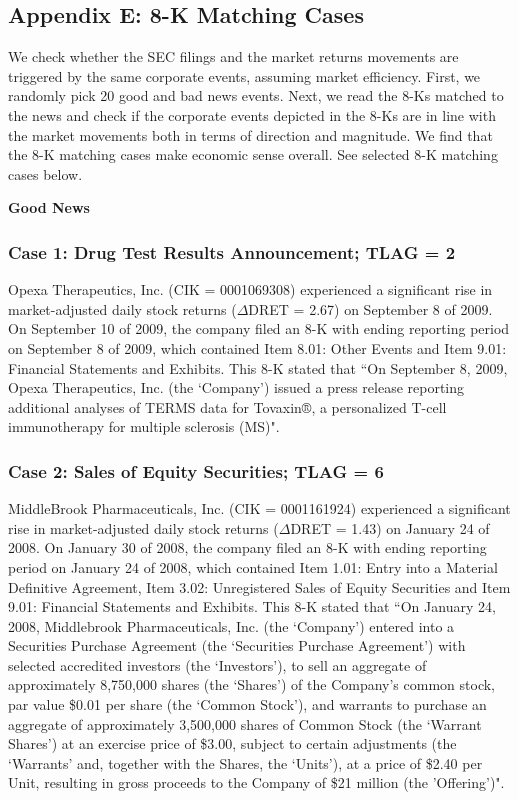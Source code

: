 \newpage
\begin{small}
\subsection*{Appendix E: 8-K Matching Cases}
We check whether the SEC filings and the market returns movements are triggered by the same corporate events, assuming market efficiency. First, we randomly pick 20 good and bad news events. Next, we read the 8-Ks matched to the news and check if the corporate events depicted in the 8-Ks are in line with the market movements both in terms of direction and magnitude. We find that the 8-K matching cases make economic sense overall. See selected 8-K matching cases below.
\label{appe}
\begin{center}
	\textbf{Good News}
\end{center}
\subsubsection*{Case 1: Drug Test Results Announcement; TLAG = 2}
Opexa Therapeutics, Inc. (CIK = 0001069308) experienced a significant rise in market-adjusted daily stock returns ($\Delta$DRET = 2.67) on September 8 of 2009. On September 10 of 2009, the company filed an 8-K with ending reporting period on September 8 of 2009, which contained Item 8.01: Other Events and Item 9.01: Financial Statements and Exhibits. This 8-K stated that ``On September 8, 2009, Opexa Therapeutics, Inc. (the `Company') issued a press release reporting additional analyses of TERMS data for Tovaxin®, a personalized T-cell immunotherapy for multiple sclerosis (MS)". 
\subsubsection*{Case 2: Sales of Equity Securities; TLAG = 6}
MiddleBrook Pharmaceuticals, Inc. (CIK = 0001161924) experienced a significant rise in market-adjusted daily stock returns ($\Delta$DRET = 1.43) on January 24 of 2008. On January 30 of 2008, the company filed an 8-K with ending reporting period on January 24 of 2008, which contained Item 1.01: Entry into a Material Definitive Agreement, Item 3.02: Unregistered Sales of Equity Securities and Item 9.01: Financial Statements and Exhibits. This 8-K stated that ``On January 24, 2008, Middlebrook Pharmaceuticals, Inc. (the `Company') entered into a Securities Purchase Agreement (the `Securities Purchase Agreement') with selected accredited investors (the `Investors'), to sell an aggregate of approximately 8,750,000 shares (the `Shares') of the Company’s common stock, par value \$0.01 per share (the `Common Stock'), and warrants to purchase an aggregate of approximately 3,500,000 shares of Common Stock (the `Warrant Shares') at an exercise price of \$3.00, subject to certain adjustments (the `Warrants' and, together with the Shares, the `Units'), at a price of \$2.40 per Unit, resulting in gross proceeds to the Company of \$21 million (the 'Offering')".

\end{small}
